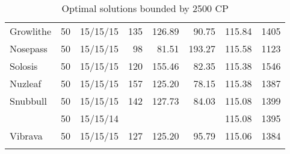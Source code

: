 \begin{longtable}{lrrrrrrr}
Growlithe & 50 & 15/15/15 & 135 & 126.89 & 90.75 & 115.84 & 1405\\
Nosepass & 50 & 15/15/15 & 98 & 81.51 & 193.27 & 115.58 & 1123\\
Solosis & 50 & 15/15/15 & 120 & 155.46 & 82.35 & 115.38 & 1546\\
Nuzleaf & 50 & 15/15/15 & 157 & 125.20 & 78.15 & 115.38 & 1387\\
Snubbull & 50 & 15/15/15 & 142 & 127.73 & 84.03 & 115.08 & 1399\\
 & 50 & 15/15/14 & & & & 115.08 & 1395\\
Vibrava & 50 & 15/15/15 & 127 & 125.20 & 95.79 & 115.06 & 1384\\
\caption{Optimal solutions bounded by 2500 CP}
\label{table:cp2500}
\end{longtable}
\endgroup

